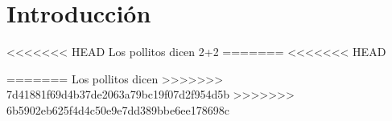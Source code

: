 \section*{Introducción}

\lipsum[2]
<<<<<<< HEAD
Los pollitos dicen
2+2
=======
<<<<<<< HEAD

\cite{medina1010}
=======
Los pollitos dicen
>>>>>>> 7d41881f69d4b37de2063a79bc19f07d2f954d5b
>>>>>>> 6b5902eb625f4d4c50e9e7dd389bbe6ee178698c
